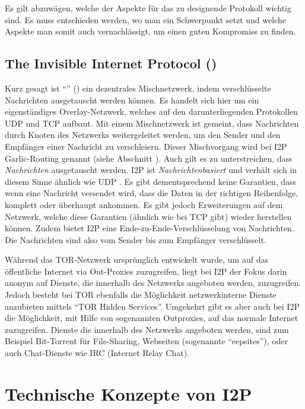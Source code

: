 Es gilt abzuwägen, welche der Aspekte für das zu designende Protokoll wichtig sind.
Es muss entschieden werden, wo man ein Schwerpunkt setzt und welche Aspekte man somit auch vernachlässigt, um einen guten Kompromiss zu finden. \parencites[S.~1-2]{das_anonymity_2018}

\subsection{The Invisible Internet Protocol () }

Kurz gesagt ist ``'' () ein dezentrales Mischnetzwerk, indem verschlüsselte Nachrichten ausgetauscht werden können.
Es handelt sich hier um ein eigenständiges Overlay-Netzwerk, welches auf den darunterliegenden Protokollen UDP und TCP aufbaut.
Mit einem Mischnetzwerk ist gemeint, dass Nachrichten durch Knoten des Netzwerks weitergeleitet werden, um den Sender und den Empfänger einer Nachricht zu verschleiern. Dieser Mischvorgang wird bei I2P Garlic-Routing genannt (siehe Abschnitt ).
Auch gilt es zu unterstreichen, dass \textit{Nachrichten} ausgetauscht werden.
I2P ist \textit{Nachrichtenbasiert} und verhält sich in diesem Sinne ähnlich wie UDP \parencite[S.~1]{zantout_i2p_2011}.
Es gibt dementsprechend keine Garantien, dass wenn eine Nachricht versendet wird, dass die Daten in der richtigen Reihenfolge, komplett oder überhaupt ankommen.
Es gibt jedoch Erweiterungen auf dem Netzwerk, welche diese Garantien (ähnlich wie bei TCP gibt) wieder herstellen können.
Zudem bietet I2P eine Ende-zu-Ende-Verschlüsselung von Nachrichten.
Die Nachrichten sind also vom Sender bis zum Empfänger verschlüsselt.

Während das TOR-Netzwerk ursprünglich entwickelt wurde, um auf das öffentliche Internet via Out-Proxies zuzugreifen,
liegt bei I2P der Fokus darin anonym auf Dienste, die innerhalb des Netzwerks angeboten werden, zuzugreifen.
Jedoch besteht bei TOR ebenfalls die Möglichkeit netzwerkinterne Dienste anzubieten mittels ``TOR Hidden Services''. Umgekehrt gibt es aber auch bei I2P die Möglichkeit, mit Hilfe von sogenannten Outproxies, auf das normale Internet zuzugreifen. \parencite[S. 2]{ehlert_i2p_2011} 
Dienste die innerhalb des Netzwerks angeboten werden, sind zum Beispiel Bit-Torrent für File-Sharing, Webseiten (sogenannte ``eepsites''), oder auch Chat-Dienste wie IRC (Internet Relay Chat).
\parencite[p.~3-4]{de_boer_invisible_2019,noauthor_i2p_nodate}


\section{Technische Konzepte von I2P}
\label{sec:technischeKonzepte}


